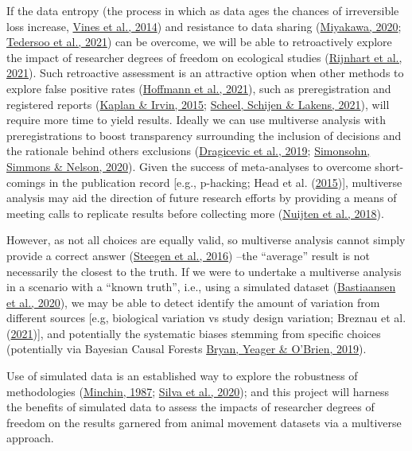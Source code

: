 \documentclass[10pt,a4paper]{article}
\begin{document}
If the data entropy (the process in which as data ages the chances of irreversible loss increase, \protect\hyperlink{ref-vines_availability_2014}{Vines et al., 2014}) and resistance to data sharing (\protect\hyperlink{ref-miyakawa_no_2020}{Miyakawa, 2020}; \protect\hyperlink{ref-tedersoo_data_2021}{Tedersoo et al., 2021}) can be overcome, we will be able to retroactively explore the impact of researcher degrees of freedom on ecological studies (\protect\hyperlink{ref-rijnhart_assessing_2021}{Rijnhart et al., 2021}).
Such retroactive assessment is an attractive option when other methods to explore false positive rates (\protect\hyperlink{ref-hoffmann_multiplicity_2021}{Hoffmann et al., 2021}), such as preregistration and registered reports (\protect\hyperlink{ref-kaplan_likelihood_2015}{Kaplan \& Irvin, 2015}; \protect\hyperlink{ref-scheel_excess_2021}{Scheel, Schijen \& Lakens, 2021}), will require more time to yield results.
Ideally we can use multiverse analysis with preregistrations to boost transparency surrounding the inclusion of decisions and the rationale behind others exclusions (\protect\hyperlink{ref-dragicevic_increasing_2019}{Dragicevic et al., 2019}; \protect\hyperlink{ref-simonsohn_specification_2020}{Simonsohn, Simmons \& Nelson, 2020}).
Given the success of meta-analyses to overcome short-comings in the publication record {[}e.g., p-hacking; Head et al. (\protect\hyperlink{ref-head_extent_2015}{2015}){]}, multiverse analysis may aid the direction of future research efforts by providing a means of meeting calls to replicate results before collecting more (\protect\hyperlink{ref-nuijten_verify_2018}{Nuijten et al., 2018}).

However, as not all choices are equally valid, so multiverse analysis cannot simply provide a correct answer (\protect\hyperlink{ref-steegen_increasing_2016}{Steegen et al., 2016}) --the ``average'' result is not necessarily the closest to the truth.
If we were to undertake a multiverse analysis in a scenario with a ``known truth'', i.e., using a simulated dataset (\protect\hyperlink{ref-bastiaansen_time_2020}{Bastiaansen et al., 2020}), we may be able to detect identify the amount of variation from different sources {[}e.g, biological variation vs study design variation; Breznau et al. (\protect\hyperlink{ref-breznau_observing_2021}{2021}){]}, and potentially the systematic biases stemming from specific choices (potentially via Bayesian Causal Forests \protect\hyperlink{ref-bryan_replicator_2019}{Bryan, Yeager \& O'Brien, 2019}).

Use of simulated data is an established way to explore the robustness of methodologies (\protect\hyperlink{ref-minchin_simulation_1987}{Minchin, 1987}; \protect\hyperlink{ref-silva_reptiles_2020}{Silva et al., 2020}); and this project will harness the benefits of simulated data to assess the impacts of researcher degrees of freedom on the results garnered from animal movement datasets via a multiverse approach.
\end{document}
